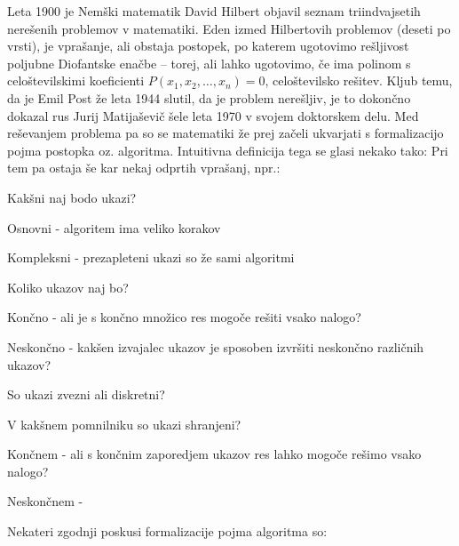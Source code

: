 \documentclass[10pt,a4paper,oneside]{book}
\begin{document}

Leta 1900 je Nemški matematik David Hilbert objavil seznam triindvajsetih nerešenih problemov v matematiki. Eden izmed Hilbertovih problemov (deseti po vrsti), je vprašanje, ali obstaja postopek, po katerem ugotovimo rešljivost poljubne Diofantske enačbe -- torej, ali lahko ugotovimo, če ima polinom s celoštevilskimi koeficienti $P(x_1, x_2, \dots, x_n)=0$, celoštevilsko rešitev.
Kljub temu, da je Emil Post že leta 1944 slutil, da je problem nerešljiv, je to dokončno dokazal rus Jurij Matijaševič šele leta 1970 v svojem doktorskem delu. Med reševanjem problema pa so se matematiki že prej začeli ukvarjati s formalizacijo pojma postopka oz. algoritma. Intuitivna definicija tega se glasi nekako tako:
Pri tem pa ostaja še kar nekaj odprtih vprašanj, npr.:
\begin{items}
\item Kakšni naj bodo ukazi? 
	\begin{items}
	\item Osnovni - algoritem ima veliko korakov
	\item Kompleksni - prezapleteni ukazi so že sami algoritmi
	\end{items}
\item Koliko ukazov naj bo?
	\begin{items}
	\item Končno - ali je s končno množico res mogoče rešiti vsako nalogo?
	\item Neskončno - kakšen izvajalec ukazov je sposoben izvršiti neskončno različnih ukazov?
	\end{items}
\item So ukazi zvezni ali diskretni?
\item V kakšnem pomnilniku so ukazi shranjeni?
	\begin{items}%
	\item Končnem - ali s končnim zaporedjem ukazov res lahko mogoče rešimo vsako nalogo?
	\item Neskončnem - \fixme%
	\end{items}
\end{items}
Nekateri zgodnji poskusi formalizacije pojma algoritma so:%
\end{document}
